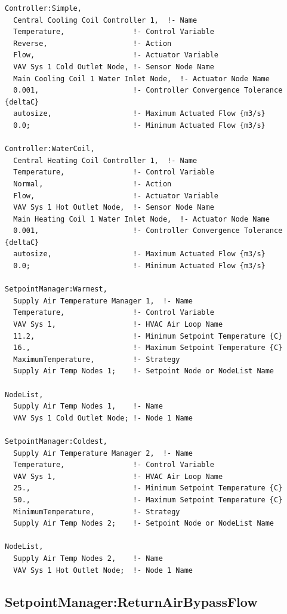 \begin{lstlisting}
Controller:Simple,
  Central Cooling Coil Controller 1,  !- Name
  Temperature,                !- Control Variable
  Reverse,                    !- Action
  Flow,                       !- Actuator Variable
  VAV Sys 1 Cold Outlet Node, !- Sensor Node Name
  Main Cooling Coil 1 Water Inlet Node,  !- Actuator Node Name
  0.001,                      !- Controller Convergence Tolerance {deltaC}
  autosize,                   !- Maximum Actuated Flow {m3/s}
  0.0;                        !- Minimum Actuated Flow {m3/s}

Controller:WaterCoil,
  Central Heating Coil Controller 1,  !- Name
  Temperature,                !- Control Variable
  Normal,                     !- Action
  Flow,                       !- Actuator Variable
  VAV Sys 1 Hot Outlet Node,  !- Sensor Node Name
  Main Heating Coil 1 Water Inlet Node,  !- Actuator Node Name
  0.001,                      !- Controller Convergence Tolerance {deltaC}
  autosize,                   !- Maximum Actuated Flow {m3/s}
  0.0;                        !- Minimum Actuated Flow {m3/s}

SetpointManager:Warmest,
  Supply Air Temperature Manager 1,  !- Name
  Temperature,                !- Control Variable
  VAV Sys 1,                  !- HVAC Air Loop Name
  11.2,                       !- Minimum Setpoint Temperature {C}
  16.,                        !- Maximum Setpoint Temperature {C}
  MaximumTemperature,         !- Strategy
  Supply Air Temp Nodes 1;    !- Setpoint Node or NodeList Name

NodeList,
  Supply Air Temp Nodes 1,    !- Name
  VAV Sys 1 Cold Outlet Node; !- Node 1 Name

SetpointManager:Coldest,
  Supply Air Temperature Manager 2,  !- Name
  Temperature,                !- Control Variable
  VAV Sys 1,                  !- HVAC Air Loop Name
  25.,                        !- Minimum Setpoint Temperature {C}
  50.,                        !- Maximum Setpoint Temperature {C}
  MinimumTemperature,         !- Strategy
  Supply Air Temp Nodes 2;    !- Setpoint Node or NodeList Name

NodeList,
  Supply Air Temp Nodes 2,    !- Name
  VAV Sys 1 Hot Outlet Node;  !- Node 1 Name
\end{lstlisting}

\subsection{SetpointManager:ReturnAirBypassFlow}\label{setpointmanagerreturnairbypassflow}

